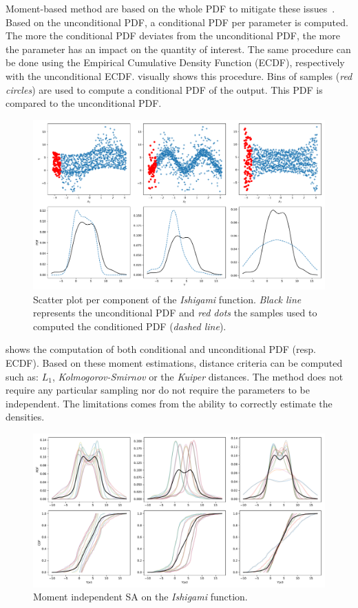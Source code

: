 Moment-based method are based on the whole PDF to mitigate these issues~\cite{borgonovo2007}. Based on the unconditional PDF, a conditional PDF per parameter is computed. The more the conditional PDF deviates from the unconditional PDF, the more the parameter has an impact on the quantity of interest. The same procedure can be done using the Empirical Cumulative Density Function (ECDF), respectively with the unconditional ECDF.  visually shows this procedure. Bins of samples (\emph{red circles}) are used to compute a conditional PDF of the output. This PDF is compared to the unconditional PDF.

\begin{figure}[!h]
\centering
\includegraphics[width=\linewidth,keepaspectratio]{fig/literature/scatter_moments.pdf}
\caption{Scatter plot per component of the \textit{Ishigami} function. \emph{Black line} represents the unconditional PDF and \emph{red dots} the samples used to computed the conditioned PDF (\emph{dashed line}).}
\label{fig:scatter_moments}
\end{figure}

 shows the computation of both conditional and unconditional PDF (resp. ECDF). Based on these moment estimations, distance criteria can be computed such as: $L_1$, \emph{Kolmogorov-Smirnov} or the \emph{Kuiper} distances. The method does not require any particular sampling nor do not require the parameters to be independent. The limitations comes from the ability to correctly estimate the densities.

\begin{figure}[!h]
\centering
\includegraphics[width=\linewidth,keepaspectratio]{fig/literature/moment_independent-ishigami.pdf}
\caption{Moment independent SA on the \emph{Ishigami} function.}
\label{fig:moment_sa}
\end{figure}

